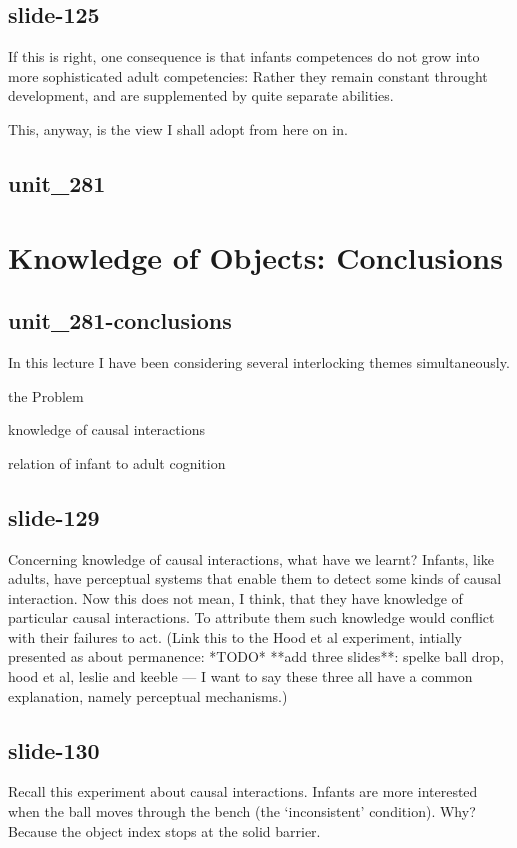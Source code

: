 \documentclass[12pt,\papersize]{extarticle}
\begin{document}
\subsection{slide-125}
If this is right, one consequence is that infants competences do not grow into more 
sophisticated adult competencies:  Rather they remain constant throught development, and 
are supplemented by quite separate abilities.
 
This, anyway, is the view I shall adopt from here on in.
 
\subsection{unit\_281}
 
 
\section{Knowledge of Objects: Conclusions}
 
\subsection{unit\_281-conclusions}
In this lecture I have been considering several interlocking themes simultaneously.
 
the Problem

          
knowledge of causal interactions

          
relation of infant to adult cognition
 
\subsection{slide-129}
Concerning knowledge of causal interactions, what have we learnt?
Infants, like adults, have perceptual systems that enable them to detect some kinds of 
causal interaction.
Now this does not mean, I think, that they have knowledge of particular causal interactions.
To attribute them such knowledge would conflict with their failures to act.
(Link this to the Hood et al experiment, intially presented as about permanence:
*TODO* **add three slides**: spelke ball drop, hood et al, leslie and keeble --- I want to
say these three all have a common explanation, namely perceptual mechanisms.)
 
\subsection{slide-130}
Recall this experiment about causal interactions.  Infants are more interested when the 
ball moves through the bench (the `inconsistent' condition).  Why?  Because the object
index stops at the solid barrier.
 
\end{document}
